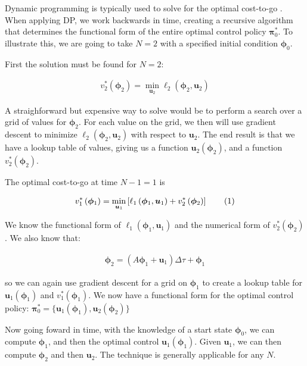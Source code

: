 \documentclass{article} %
\newcommand\numberthis{\addtocounter{equation}{1}\tag{\theequation}}
\begin{document}
Dynamic programming is typically used to solve for the optimal cost-to-go \cite{Bertsekas2000}. When applying
DP, we work backwards in time, creating a recursive algorithm that determines the
functional form of the entire optimal control policy $\bm{\pi}_0^*$. To illustrate
this, we are going to take $N=2$ with a specified initial condition $\bm{\phi}_0$.

First the solution must be found for $N=2$:

\begin{align*}
v^*_2 \left( \bm{\phi}_2 \right) = \min_{\bm{u}_2} \ell_2 \left( \bm{\phi}_2, \bm{u}_2 \right)
\end{align*}

A straighforward but expensive way to solve would be to perform a search over a
grid of values for $\bm{\phi}_2$. For each value on the grid, we then will use
gradient descent to minimize $\ell_2 \left( \bm{\phi}_2, \bm{u}_2 \right)$ with
respect to $\bm{u}_2$. The end result is that we have a lookup table of values,
giving us a function $\bm{u}_2(\bm{\phi}_2)$, and a function
$v^*_2 \left( \bm{\phi}_2 \right)$.

The optimal cost-to-go at time $N-1=1$ is

\begin{align*}
v^*_{1} \left( \bm{\phi}_{1} \right) = \min_{\bm{u}_{1}} \left[ \ell_1 \left( \bm{\phi}_{1}, \bm{u}_{1} \right) + v^*_2 \left( \bm{\phi}_2 \right) \right]  \numberthis \label{eq_dp} 
\end{align*}

We know the functional form of $\ell_1 \left( \bm{\phi}_{1}, \bm{u}_{1} \right)$ and the
numerical form of $v^*_2 \left( \bm{\phi}_2 \right)$. We also know that:

\begin{align*}
\bm{\phi}_2 = \left( A\bm{\phi}_1 + \bm{u}_1 \right) \Delta\tau + \bm{\phi}_1
\end{align*}

so we can again use gradient descent for a grid on $\bm{\phi}_1$ to create a lookup
table for $\bm{u}_1(\bm{\phi}_1)$ and $v^*_1 \left( \bm{\phi}_1 \right)$. We now have
a functional form for the optimal control policy: $\bm{\pi}_0^* = \{ \bm{u}_1(\bm{\phi}_1), \bm{u}_2(\bm{\phi}_2) \}$

Now going foward in time, with the knowledge of a start state $\bm{\phi}_0$, we can 
compute $\bm{\phi}_1$, and then the optimal control $\bm{u}_1 \left( \bm{\phi}_1 \right)$.
Given $\bm{u}_1$, we can then compute $\bm{\phi}_2$ and then $\bm{u}_2$. The technique
is generally applicable for any $N$.
\end{document}
